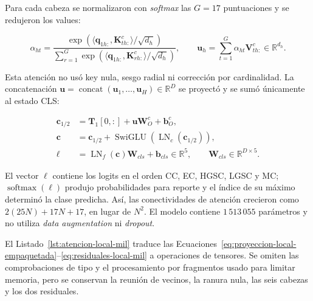 Para cada cabeza se normalizaron con \emph{softmax} las \(G=17\) puntuaciones
y se redujeron los values:

\begin{equation}
    \alpha_{ht}=
      \frac{\exp(\langle\mathbf q_{1h:},\mathbf K^c_{th:}\rangle/\sqrt{d_h})}
      {\sum_{r=1}^{G}\exp(\langle\mathbf q_{1h:},\mathbf K^c_{rh:}\rangle/\sqrt{d_h})},
    \qquad
    \mathbf u_h=\sum_{t=1}^{G}\alpha_{ht}\mathbf V^c_{th:}
       \in\mathbb R^{d_h}.
    \label{eq:atencion-cls-final-mil}
\end{equation}

Esta atención no usó key nula, sesgo radial ni corrección por cardinalidad.
La concatenación
\(\mathbf u=\operatorname{concat}(\mathbf u_1,\ldots,\mathbf u_H)
\in\mathbb R^D\) se proyectó y se sumó únicamente al estado CLS:

\begin{equation}
    \begin{aligned}
    \mathbf c_{1/2}&=\mathbf T_1[0,:]+
       \mathbf u\mathbf W_O^c+\mathbf b_O^c,\\
    \mathbf c&=\mathbf c_{1/2}+
       \operatorname{SwiGLU}(\operatorname{LN}_{c}(\mathbf c_{1/2})),\\
    \boldsymbol\ell&=\operatorname{LN}_{f}(\mathbf c)\mathbf W_{cls}
       +\mathbf b_{cls}\in\mathbb R^5,
       \qquad \mathbf W_{cls}\in\mathbb R^{D\times5}.
    \end{aligned}
    \label{eq:salida-cls-mil}
\end{equation}

El vector \(\boldsymbol\ell\) contiene los logits en el orden CC, EC, HGSC,
LGSC y MC; \(\operatorname{softmax}(\boldsymbol\ell)\) produjo probabilidades
para reporte y el índice de su máximo determinó la clase predicha. Así, las
conectividades de atención crecieron como
\(2(25N)+17N+17\), en lugar de \(N^2\). El modelo contiene
\(1\,513\,055\) parámetros y no utiliza \emph{data augmentation} ni \emph{dropout}.

El Listado~\ref{lst:atencion-local-mil} traduce las
Ecuaciones~\eqref{eq:proyeccion-local-empaquetada}--\eqref{eq:residuales-local-mil}
a operaciones de tensores. Se omiten las comprobaciones de tipo y el
procesamiento por fragmentos usado para limitar memoria, pero se conservan la
reunión de vecinos, la ranura nula, las seis cabezas y los dos residuales.

